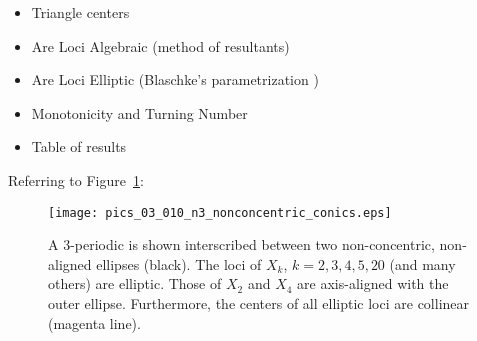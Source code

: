 \begin{itemize}
    \item Triangle centers
    \item Are Loci Algebraic (method of resultants)
    \item Are Loci Elliptic (Blaschke's parametrization \cite{daepp-2019})
    \item Monotonicity and Turning Number
    \item Table of results
\end{itemize}

Referring to Figure~\ref{fig:nonconcentric-xns}:

\begin{figure}
     \centering
     \texttt{[image: pics\_03\_010\_n3\_nonconcentric\_conics.eps]}
     \caption{A 3-periodic is shown interscribed between two non-concentric, non-aligned ellipses (black). The loci of $X_k$, $k=2,3,4,5,20$ (and many others) are elliptic. Those of $X_2$ and $X_4$ are axis-aligned with the outer ellipse. Furthermore, the centers of all elliptic loci are collinear (magenta line).}
     \label{fig:nonconcentric-xns}
 \end{figure}
